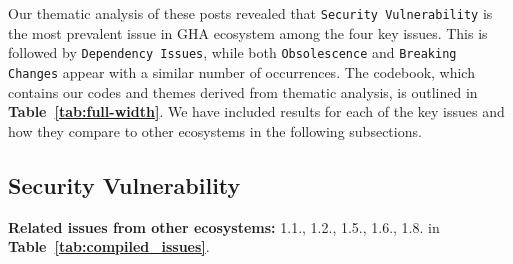 \documentclass[conference]{IEEEtran}
\begin{document}
Our thematic analysis of these posts revealed that \texttt{Security Vulnerability} is the most prevalent issue in GHA ecosystem among the four key issues. This is followed by \texttt{Dependency Issues}, while both \texttt{Obsolescence} and \texttt{Breaking Changes} appear with a similar number of occurrences. The codebook, which contains our codes and themes derived from thematic analysis, is outlined in \textbf{Table~\ref{tab:full-width}}. We have included results for each of the key issues and how they compare to other ecosystems in the following subsections.
\subsection*{\textbf{Security Vulnerability}}
\textbf{Related issues from other ecosystems:} 1.1., 1.2., 1.5., 1.6., 1.8. in \textbf{Table~\ref{tab:compiled_issues}}.\\
\end{document}
